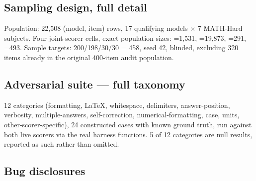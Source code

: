 \subsection{Sampling design, full detail}
\label{sec:appendix-sampling}

Population: 22{,}508 (model, item) rows, 17 qualifying models $\times$ 7
MATH-Hard subjects. Four joint-scorer cells, exact population sizes:
=1{,}531, =19{,}873,
=291,
=493. Sample targets: 200/198/30/30 =
458, seed 42, blinded, excluding 320 items already in the original 400-item
audit population.

\subsection{Adversarial suite --- full taxonomy}
\label{sec:appendix-adversarial}

12 categories (formatting, LaTeX, whitespace, delimiters, answer-position,
verbosity, multiple-answers, self-correction, numerical-formatting, case,
units, other-scorer-specific), 24 constructed cases with known ground truth,
run against both live scorers via the real harness functions. 5 of 12
categories are null results, reported as such rather than omitted.

\subsection{Bug disclosures}
\label{sec:appendix-bugs}


